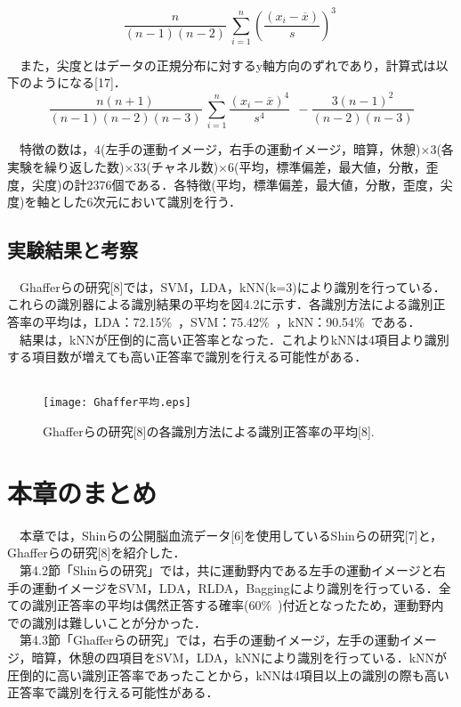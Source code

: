 \documentclass[a4j,12pt]{jreport}
\begin{document}
\begin{equation}
\frac{n}{(n-1)(n-2)} \ \sum_{i=1}^{n} (\frac{(x_i-\overline{x})}{s})^3 \ 
\end{equation} 

　また，尖度とはデータの正規分布に対するy軸方向のずれであり，計算式は以下のようになる[17]．\\

\begin{equation}
\frac{n(n+1)}{(n-1)(n-2)(n-3)} \ \sum_{i=1}^{n} \frac{(x_i-\overline{x})^4}{s^4} \ \ - \frac{3(n-1)^2}{(n-2)(n-3)}
\end{equation}

　特徴の数は，4(左手の運動イメージ，右手の運動イメージ，暗算，休憩)×3(各実験を繰り返した数)×33(チャネル数)×6(平均，標準偏差，最大値，分散，歪度，尖度)の計2376個である．各特徴(平均，標準偏差，最大値，分散，歪度，尖度)を軸とした6次元において識別を行う．\\

\subsection{実験結果と考察}
　Ghafferらの研究[8]では，SVM，LDA，kNN(k=3)により識別を行っている．これらの識別器による識別結果の平均を図4.2に示す．各識別方法による識別正答率の平均は，LDA：72.15\%\ ，SVM：75.42\%\ ，kNN：90.54\%\ である．\\
　結果は，kNNが圧倒的に高い正答率となった．これよりkNNは4項目より識別する項目数が増えても高い正答率で識別を行える可能性がある．\\

　\begin{figure}[t]
  \begin{center}
    \texttt{[image: Ghaffer平均.eps]}
    \caption{Ghafferらの研究[8]の各識別方法による識別正答率の平均[8].}
    \label{fig}
  \end{center}
\end{figure}

\section{本章のまとめ}
　本章では，Shinらの公開脳血流データ[6]を使用しているShinらの研究[7]と，Ghafferらの研究[8]を紹介した．\\
　第4.2節「Shinらの研究」では，共に運動野内である左手の運動イメージと右手の運動イメージをSVM，LDA，RLDA，Baggingにより識別を行っている．全ての識別正答率の平均は偶然正答する確率(60\%\ )付近となったため，運動野内での識別は難しいことが分かった．\\
　第4.3節「Ghafferらの研究」では，右手の運動イメージ，左手の運動イメージ，暗算，休憩の四項目をSVM，LDA，kNNにより識別を行っている．kNNが圧倒的に高い識別正答率であったことから，kNNは4項目以上の識別の際も高い正答率で識別を行える可能性がある．\\
\end{document}
